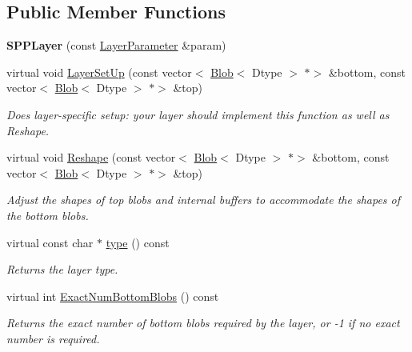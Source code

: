 \subsection*{Public Member Functions}
\begin{DoxyCompactItemize}
\item 
\mbox{\label{classcaffe_1_1_s_p_p_layer_a2f2bfccabcb9c04d28435ae6cb535dcf}} 
{\bfseries S\+P\+P\+Layer} (const \mbox{\hyperlink{classcaffe_1_1_layer_parameter}{Layer\+Parameter}} \&param)
\item 
virtual void \mbox{\hyperlink{classcaffe_1_1_s_p_p_layer_a7241f9c4dfba841bc76a93298a3d28ee}{Layer\+Set\+Up}} (const vector$<$ \mbox{\hyperlink{classcaffe_1_1_blob}{Blob}}$<$ Dtype $>$ $\ast$$>$ \&bottom, const vector$<$ \mbox{\hyperlink{classcaffe_1_1_blob}{Blob}}$<$ Dtype $>$ $\ast$$>$ \&top)
\begin{DoxyCompactList}\small\item\em Does layer-\/specific setup\+: your layer should implement this function as well as Reshape. \end{DoxyCompactList}\item 
virtual void \mbox{\hyperlink{classcaffe_1_1_s_p_p_layer_a3ba65e459c1bde4f772d545efb43a2f2}{Reshape}} (const vector$<$ \mbox{\hyperlink{classcaffe_1_1_blob}{Blob}}$<$ Dtype $>$ $\ast$$>$ \&bottom, const vector$<$ \mbox{\hyperlink{classcaffe_1_1_blob}{Blob}}$<$ Dtype $>$ $\ast$$>$ \&top)
\begin{DoxyCompactList}\small\item\em Adjust the shapes of top blobs and internal buffers to accommodate the shapes of the bottom blobs. \end{DoxyCompactList}\item 
\mbox{\label{classcaffe_1_1_s_p_p_layer_aafd1daca2ac42380582cad761bc6d57b}} 
virtual const char $\ast$ \mbox{\hyperlink{classcaffe_1_1_s_p_p_layer_aafd1daca2ac42380582cad761bc6d57b}{type}} () const
\begin{DoxyCompactList}\small\item\em Returns the layer type. \end{DoxyCompactList}\item 
virtual int \mbox{\hyperlink{classcaffe_1_1_s_p_p_layer_a0fcc7996823cba1a468e82b3f9058ff0}{Exact\+Num\+Bottom\+Blobs}} () const
\begin{DoxyCompactList}\small\item\em Returns the exact number of bottom blobs required by the layer, or -\/1 if no exact number is required. \end{DoxyCompactList}\item 

\end{DoxyCompactItemize}
